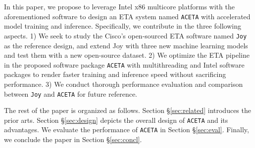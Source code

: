 In this paper, we propose to leverage Intel x86 multicore platforms with the aforementioned software to design an ETA system named \texttt{ACETA} with accelerated model training and inference. Specifically, we contribute in the three following aspects. 1) We seek to study the Cisco’s open-sourced ETA software named \texttt{Joy} \cite{joy} as the reference design, and extend Joy with three new machine learning models and test them with a new open-source dataset. 2) We optimize the ETA pipeline in the proposed software package \texttt{ACETA} with multithreading and Intel software packages to render faster training and inference speed without sacrificing performance. 3) We conduct thorough performance evaluation and comparison between \texttt{Joy} and \texttt{ACETA} for future reference.   

The rest of the paper is organized as follows. Section \S \ref{sec:related} introduces the prior arts. Section \S \ref{sec:design} depicts the overall design of \texttt{ACETA} and its advantages. We evaluate the performance of \texttt{ACETA} in Section \S \ref{sec:eval}. Finally, we conclude the paper in Section \S \ref{sec:concl}.